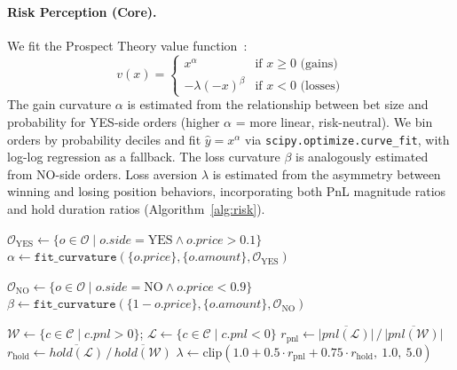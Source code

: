 \documentclass[11pt]{article}
\begin{document}
\paragraph{Risk Perception (Core).}
We fit the Prospect Theory value function~\citep{kahneman1979prospect}:
\begin{equation}
    v(x) = \begin{cases} x^\alpha & \text{if } x \geq 0 \text{ (gains)} \\ -\lambda(-x)^\beta & \text{if } x < 0 \text{ (losses)} \end{cases}
\end{equation}
The gain curvature $\alpha$ is estimated from the relationship between bet size and probability for YES-side orders (higher $\alpha$ = more linear, risk-neutral). We bin orders by probability deciles and fit $\hat{y} = x^\alpha$ via \texttt{scipy.optimize.curve\_fit}, with log-log regression as a fallback. The loss curvature $\beta$ is analogously estimated from NO-side orders. Loss aversion $\lambda$ is estimated from the asymmetry between winning and losing position behaviors, incorporating both PnL magnitude ratios and hold duration ratios (Algorithm~\ref{alg:risk}).

\begin{algorithm}[t]
\caption{Risk Perception via Prospect Theory}
\label{alg:risk}
\KwOut{$\alpha, \beta, \lambda$}

$\mathcal{O}_{\text{YES}} \gets \{o \in \mathcal{O} \mid o.\mathit{side} = \text{YES} \land o.\mathit{price} > 0.1\}$\;
$\alpha \gets \texttt{fit\_curvature}(\{o.\mathit{price}\}, \{o.\mathit{amount}\}, \mathcal{O}_{\text{YES}})$ 

$\mathcal{O}_{\text{NO}} \gets \{o \in \mathcal{O} \mid o.\mathit{side} = \text{NO} \land o.\mathit{price} < 0.9\}$\;
$\beta \gets \texttt{fit\_curvature}(\{1 - o.\mathit{price}\}, \{o.\mathit{amount}\}, \mathcal{O}_{\text{NO}})$\;

$\mathcal{W} \gets \{c \in \mathcal{C} \mid c.\mathit{pnl} > 0\}$; $\mathcal{L} \gets \{c \in \mathcal{C} \mid c.\mathit{pnl} < 0\}$\;
$r_{\text{pnl}} \gets \overline{|\mathit{pnl}(\mathcal{L})|} \,/\, \overline{|\mathit{pnl}(\mathcal{W})|}$\;
$r_{\text{hold}} \gets \overline{\mathit{hold}(\mathcal{L})} \,/\, \overline{\mathit{hold}(\mathcal{W})}$\;
$\lambda \gets \text{clip}(1.0 + 0.5 \cdot r_{\text{pnl}} + 0.75 \cdot r_{\text{hold}},\ 1.0,\ 5.0)$\;

\Return{$\alpha, \beta, \lambda$}
\end{algorithm}
\end{document}
